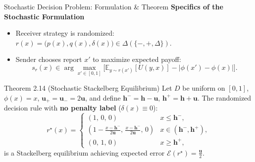 \documentclass[aspectratio=169, 11pt, t, xcolor=table]{beamer}
\newcommand{\E}{\mathbb{E}}
\newcommand{\cg}[1]{\mathcal{#1}}
\newcommand{\hh}{\mathbf{h}}
\newcommand{\um}{\mathbf{u_-}}
\newcommand{\up}{\mathbf{u_+}}
\newcommand{\uu}{\mathbf{u}}
\newcommand{\hminus}{\mathbf{h^{-}}}
\newcommand{\hplus}{\mathbf{h^{+}}}
\newcommand{\minus}{\mathbf{-}}
\newcommand{\plus}{\mathbf{+}}
\newcommand{\rs}{r^{\star}}
\begin{document}
\begin{frame}{Stochastic Decision Problem: Formulation \& Theorem}
\small
\textbf{Specifics of the Stochastic Formulation}
\begin{itemize}\itemsep=1.5pt
  \item Receiver strategy is randomized: $r(x) = \big(p(x), q(x), \delta(x)\big) \in \Delta(\{\minus, \plus, \Delta\})$.
  \item Sender chooses report $x'$ to maximize expected payoff:
    \[
      s_r(x) \in \arg\max_{x' \in [0,1]} \Big[ \E_{y \sim r(x')}[U(y, x)] - |\phi(x') - \phi(x)| \Big].
    \]
\end{itemize}

\par\vspace{0.3em}
\begin{block}{Theorem 2.14 (Stochastic Stackelberg Equilibrium)}
\footnotesize
Let $D$ be uniform on $[0,1]$, $\phi(x) = x$, $\up = \um = 2\uu$, and define $\hminus = \hh - \uu$, $\hplus = \hh + \uu$.
The randomized decision rule with \textbf{no penalty label} ($\delta(x) \equiv 0$):
\[
  \rs(x) = \begin{cases}
    (1,\, 0,\, 0) & x \le \hminus, \\
    \left(1 - \frac{x-\hminus}{2\uu},\, \frac{x-\hminus}{2\uu},\, 0\right) & x \in (\hminus, \hplus), \\
    (0,\, 1,\, 0) & x \ge \hplus,
  \end{cases}
\]
is a Stackelberg equilibrium achieving expected error $\cg{E}(\rs) = \frac{\uu}{2}$.
\end{block}
\end{frame}
\end{document}
